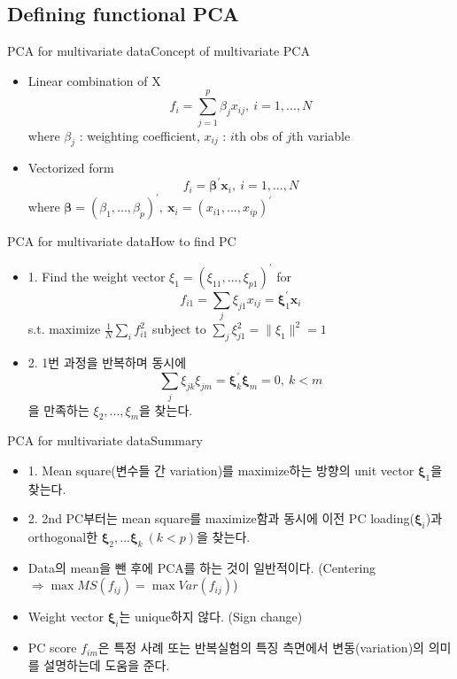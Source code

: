\documentclass{beamer}
\begin{document}
\subsection{Defining functional PCA}

\begin{frame}{PCA for multivariate data}{Concept of multivariate PCA}
	\begin{itemize}
		\item {Linear combination of X
			$$ f_i = \sum_{j=1}^{p}\beta_j x_{ij}, \ i=1,...,N $$
			where $\beta_j$ : weighting coefficient, $x_{ij}$ : $i$th obs of $j$th variable
		}
		\item {Vectorized form
			$$ f_i = \boldsymbol{\beta}^{'} \boldsymbol{x}_i, \ i=1,...,N $$
			where $ \boldsymbol{\beta}=(\beta_1,...,\beta_p)^{'}, \ \boldsymbol{x}_i=(x_{i1},...,x_{ip})^{'} $
		}
	\end{itemize}
\end{frame}

\begin{frame}{PCA for multivariate data}{How to find PC}
	\begin{itemize}
		\item {
			1. Find the weight vector $\xi_1 = (\xi_{11},...,\xi_{p1})^{'}$ for
			$$ f_{i1}=\sum_j \xi_{j1}x_{ij}=\boldsymbol{\xi}_1^{'} \boldsymbol{x}_i $$
			s.t. maximize $ \frac{1}{N}\sum_if_{i1}^2 $ subject to $\sum_j \xi_{j1}^2 = \lVert \xi_1 \rVert^2 = 1 $
		}
		\item {
			2. 1번 과정을 반복하며 동시에 
			$$ \sum_j \xi_{jk}\xi_{jm} = \boldsymbol{\xi}_k^{'} \boldsymbol{\xi}_m=0, \ k<m $$
			을 만족하는 $ \xi_2,...,\xi_m $을 찾는다.
		}
	\end{itemize}
\end{frame}

\begin{frame}{PCA for multivariate data}{Summary}
	\begin{itemize}
		\item {
			1. Mean square(변수들 간 variation)를 maximize하는 방향의 unit vector $\boldsymbol{\xi}_1 $을 찾는다.
		}
		\item {
			2. 2nd PC부터는 mean square를 maximize함과 동시에 이전 PC loading($ \boldsymbol{\xi}_i $)과 orthogonal한 $ \boldsymbol{\xi}_2,...\boldsymbol{\xi}_k \ (k<p) $을 찾는다.
		}
		\item {
			Data의 mean을 뺀 후에 PCA를 하는 것이 일반적이다. (Centering $\Rightarrow \max MS(f_{ij}) = \max Var(f_{ij}) $)
		}
		\item {
			Weight vector $\boldsymbol{\xi}_i$는 unique하지 않다. (Sign change)
		}
		\item {
			PC score $f_{im}$은 특정 사례 또는 반복실험의 특징 측면에서 변동(variation)의 의미를 설명하는데 도움을 준다.
		}
	\end{itemize}
\end{frame}
\end{document}
